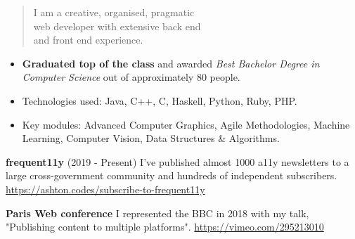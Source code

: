 \documentclass[10pt,a4paper,ragged2e,withhyper]{altacv}
\begin{document}
\begin{paracol}{2}
\divider

\switchcolumn

\begin{quote}
I am a creative, organised, pragmatic
\\
web developer with extensive back end
\\
and front end experience.
\end{quote}





\begin{itemize}
    \item \textbf{Graduated top of the class} and awarded \emph{Best Bachelor Degree in Computer Science} out of approximately 80 people.
    \item Technologies used: Java, C++, C, Haskell, Python, Ruby, PHP.
    \item Key modules: Advanced Computer Graphics, Agile Methodologies, Machine Learning, Computer Vision, Data Structures \& Algorithms.
\end{itemize}

\divider



\def\publicationspacer{0.2cm}

\textbf{frequent11y} (2019 - Present)
\newline
I've published almost 1000 a11y newsletters to a large cross-government community and hundreds of independent subscribers.
\newline
\href{https://ashton.codes/subscribe-to-frequent11y}{\url{https://ashton.codes/subscribe-to-frequent11y}}

\vspace{\publicationspacer}
\textbf{Paris Web conference}
\newline
I represented the BBC in 2018 with my talk, "Publishing content to multiple platforms".
\newline
\href{https://vimeo.com/295213010}{\url{https://vimeo.com/295213010}}


\end{paracol}
\end{document}
